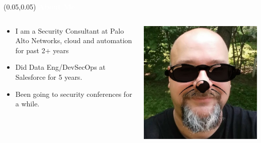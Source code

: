 \documentclass[aspectratio=169]{beamer} %
\begin{document}
\begin{frame}{}
    \setlength{\TPHorizModule}{\textwidth}
    \setlength{\TPVertModule}{\textwidth}
    \begin{textblock}{0.74} (0.05,0.05)
        \bfseries\large\textcolor{white}{About Me}
    \end{textblock}

    \begin{columns}
        \begin{column}{0.5\textwidth}
            \begin{itemize}
                \item I am a Security Consultant at Palo Alto Networks, cloud and automation for past 2+ years
                \item Did Data Eng/DevSecOps at Salesforce for 5 years.
            \item Been going to security conferences for a while.
            \end{itemize}
        \end{column}
        \begin{column}{0.45\textwidth}
            \begin{center}
            \includegraphics[width=1.0\linewidth, height=0.7\textheight]{../images/me.jpg}
            \end{center}
        \end{column}
    \end{columns}
\end{frame}
\end{document}
